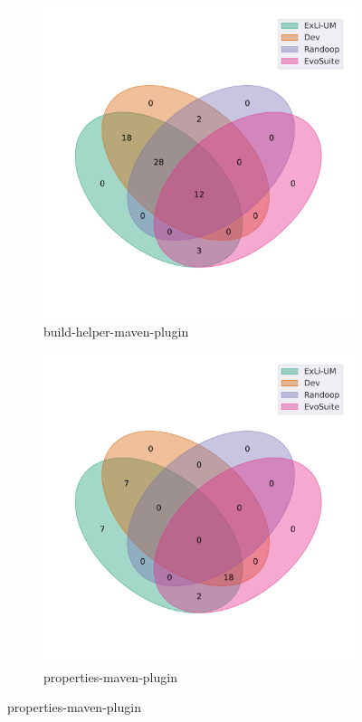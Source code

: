 \begin{figure}[t]\ContinuedFloat
\begin{subfigure}[b]{0.45\textwidth}
\includegraphics[width=\textwidth]{figures/venn/mojohaus_build-helper-maven-plugin-venn.pdf}
\vspace{-10pt}
\caption{build-helper-maven-plugin}
\label{fig:venn-mojohaus_build-helper-maven-plugin}
\end{subfigure}
\hfill
\begin{subfigure}[b]{0.45\textwidth}
\includegraphics[width=\textwidth]{figures/venn/mojohaus_properties-maven-plugin-venn.pdf}
\vspace{-10pt}
\caption{properties-maven-plugin}
\label{fig:venn-mojohaus_properties-maven-plugin}
\end{subfigure}
\end{figure}
